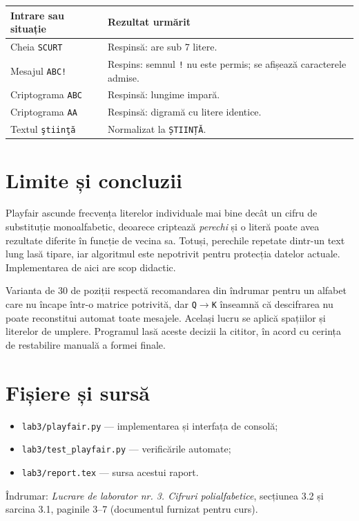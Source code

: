 \documentclass[12pt,a4paper]{article}
\newcommand{\file}[1]{\texttt{#1}}
\begin{document}
\begin{center}
\begin{tabular}{p{}p{}}
\toprule
Intrare sau situație&Rezultat urmărit\\
\midrule
Cheia \texttt{SCURT}&Respinsă: are sub 7 litere.\\
Mesajul \texttt{ABC!}&Respins: semnul \texttt{!} nu este permis; se afișează caracterele admise.\\
Criptograma \texttt{ABC}&Respinsă: lungime impară.\\
Criptograma \texttt{AA}&Respinsă: digramă cu litere identice.\\
Textul \texttt{ştiinţă}&Normalizat la \texttt{ȘTIINȚĂ}.\\
\bottomrule
\end{tabular}
\end{center}

\section{Limite și concluzii}

Playfair ascunde frecvența literelor individuale mai bine decât un cifru de
substituție monoalfabetic, deoarece criptează \emph{perechi} și o literă poate
avea rezultate diferite în funcție de vecina sa. Totuși, perechile repetate
dintr-un text lung lasă tipare, iar algoritmul este nepotrivit pentru protecția
datelor actuale. Implementarea de aici are scop didactic.

Varianta de 30 de poziții respectă recomandarea din îndrumar pentru un alfabet
care nu încape într-o matrice potrivită, dar \texttt{Q}$\to$\texttt{K} înseamnă
că descifrarea nu poate reconstitui automat toate mesajele. Același lucru se
aplică spațiilor și literelor de umplere. Programul lasă aceste decizii la
cititor, în acord cu cerința de restabilire manuală a formei finale.

\section*{Fișiere și sursă}
\begin{itemize}
\item \file{lab3/playfair.py} --- implementarea și interfața de consolă;
\item \file{lab3/test\_playfair.py} --- verificările automate;
\item \file{lab3/report.tex} --- sursa acestui raport.
\end{itemize}
Îndrumar: \emph{Lucrare de laborator nr. 3. Cifruri polialfabetice},
secțiunea 3.2 și sarcina 3.1, paginile 3--7 (documentul furnizat pentru curs).
\end{document}
